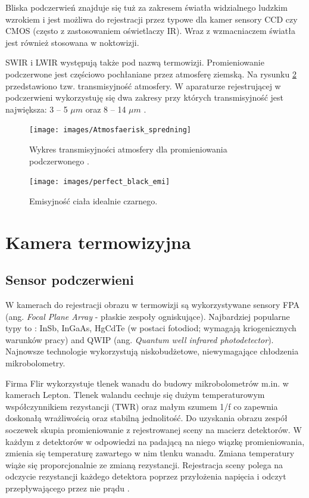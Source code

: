 Bliska podczerwień znajduje się tuż za zakresem światła widzialnego ludzkim wzrokiem i jest możliwa do rejestracji przez typowe dla kamer sensory CCD czy CMOS (często z zastosowaniem oświetlaczy  IR). Wraz z wzmacniaczem światła jest również stosowana w noktowizji.

SWIR i LWIR występują także  pod nazwą termowizji. Promieniowanie podczerwone jest częściowo pochłaniane przez atmosferę ziemską. Na rysunku \ref{fig:atmosfera_int} przedstawiono tzw. transmisyjność atmosfery. W aparaturze rejestrującej w podczerwieni wykorzystuję się dwa zakresy przy których transmisyjność jest największa: 3 -- 5 $\mu m$ oraz 8 -- 14 $\mu m$ 
\cite{niklaus2007mems}. 

\begin{figure}
\centering
\texttt{[image: images/Atmosfaerisk\_spredning]}
\caption[Wykres transmisyjności atmosfery dla promieniowania podczerwonego ]{Wykres transmisyjności atmosfery dla promieniowania podczerwonego \cite{wiki:infrared}.}
\label{fig:perfect_black}
\end{figure}

\begin{figure}
\centering
\texttt{[image: images/perfect\_black\_emi]}
\caption[Emisyjność ciała idealnie czarnego]{Emisyjność ciała idealnie czarnego.}
\label{fig:atmosfera_int}
\end{figure}


\section{Kamera termowizyjna}

\subsection{Sensor podczerwieni}
W kamerach do rejestracji obrazu w termowizji są wykorzystywane sensory FPA (ang. \textit{Focal Plane Array}  - płaskie zespoły ogniskujące). Najbardziej popularne typy to : InSb, InGaAs, HgCdTe (w postaci fotodiod; wymagają kriogenicznych warunków pracy) and QWIP (ang. \textit{ Quantum well infrared photodetector}). Najnowsze technologie wykorzystują niskobudżetowe, niewymagające chłodzenia mikrobolometry. 

Firma Flir wykorzystuje tlenek wanadu do budowy mikrobolometrów m.in. w kamerach Lepton. Tlenek walandu cechuje się dużym temperaturowym współczynnikiem rezystancji (TWR) oraz małym szumem 1/f co zapewnia doskonałą wrażliwością oraz stabilną jednolitość. Do uzyskania obrazu zespół soczewek skupia promieniowanie z rejestrowanej sceny na macierz detektorów. W każdym z detektorów w odpowiedzi na padającą na niego wiązkę promieniowania, zmienia się temperaturę zawartego w nim tlenku wanadu. Zmiana temperatury wiąże się proporcjonalnie ze zmianą rezystancji. Rejestracja sceny polega na odczycie rezystancji każdego detektora poprzez przyłożenia napięcia i odczyt przepływającego przez nie prądu \cite{flir:lepton}. 

